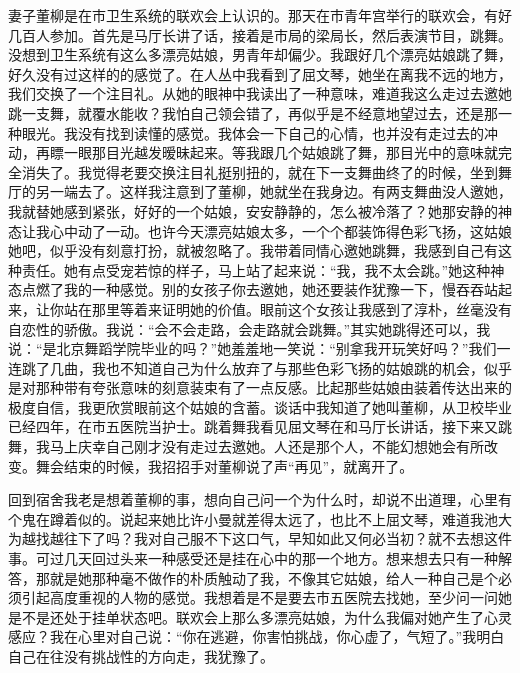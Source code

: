 \documentclass[12pt,oneside]{book}
\begin{document}
妻子董柳是在市卫生系统的联欢会上认识的。那天在市青年宫举行的联欢会，有好几百人参加。首先是马厅长讲了话，接着是市局的梁局长，然后表演节目，跳舞。没想到卫生系统有这么多漂亮姑娘，男青年却偏少。我跟好几个漂亮姑娘跳了舞，好久没有过这样的的感觉了。在人丛中我看到了屈文琴，她坐在离我不远的地方，我们交换了一个注目礼。从她的眼神中我读出了一种意味，难道我这么走过去邀她跳一支舞，就覆水能收？我怕自己领会错了，再似乎是不经意地望过去，还是那一种眼光。我没有找到读懂的感觉。我体会一下自己的心情，也并没有走过去的冲动，再瞟一眼那目光越发暧昧起来。等我跟几个姑娘跳了舞，那目光中的意味就完全消失了。我觉得老要交换注目礼挺别扭的，就在下一支舞曲终了的时候，坐到舞厅的另一端去了。这样我注意到了董柳，她就坐在我身边。有两支舞曲没人邀她，我就替她感到紧张，好好的一个姑娘，安安静静的，怎么被冷落了？她那安静的神态让我心中动了一动。也许今天漂亮姑娘太多，一个个都装饰得色彩飞扬，这姑娘她吧，似乎没有刻意打扮，就被忽略了。我带着同情心邀她跳舞，我感到自己有这种责任。她有点受宠若惊的样子，马上站了起来说：``我，我不太会跳。''她这种神态点燃了我的一种感觉。别的女孩子你去邀她，她还要装作犹豫一下，慢吞吞站起来，让你站在那里等着来证明她的价值。眼前这个女孩让我感到了淳朴，丝毫没有自恋性的骄傲。我说：``会不会走路，会走路就会跳舞。''其实她跳得还可以，我说：``是北京舞蹈学院毕业的吗？''她羞羞地一笑说：``别拿我开玩笑好吗？''我们一连跳了几曲，我也不知道自己为什么放弃了与那些色彩飞扬的姑娘跳的机会，似乎是对那种带有夸张意味的刻意装束有了一点反感。比起那些姑娘由装着传达出来的极度自信，我更欣赏眼前这个姑娘的含蓄。谈话中我知道了她叫董柳，从卫校毕业已经四年，在市五医院当护士。跳着舞我看见屈文琴在和马厅长讲话，接下来又跳舞，我马上庆幸自己刚才没有走过去邀她。人还是那个人，不能幻想她会有所改变。舞会结束的时候，我招招手对董柳说了声``再见''，就离开了。

回到宿舍我老是想着董柳的事，想向自己问一个为什么时，却说不出道理，心里有个鬼在蹲着似的。说起来她比许小曼就差得太远了，也比不上屈文琴，难道我池大为越找越往下了吗？我对自己服不下这口气，早知如此又何必当初？就不去想这件事。可过几天回过头来一种感受还是挂在心中的那一个地方。想来想去只有一种解答，那就是她那种毫不做作的朴质触动了我，不像其它姑娘，给人一种自己是个必须引起高度重视的人物的感觉。我想着是不是要去市五医院去找她，至少问一问她是不是还处于挂单状态吧。联欢会上那么多漂亮姑娘，为什么我偏对她产生了心灵感应？我在心里对自己说：``你在逃避，你害怕挑战，你心虚了，气短了。''我明白自己在往没有挑战性的方向走，我犹豫了。
\end{document}
